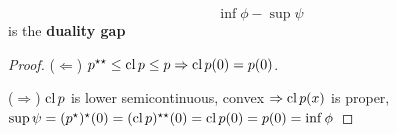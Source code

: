 \begin{defn}
  \label{defn:conjugate_functions:12}
  \begin{equation}
    \label{eq:61}
    \inf \phi - \sup \psi
  \end{equation} is the \textbf{duality gap}
\end{defn}

\begin{proof}
  ($\Leftarrow$) $p^{\star \star} \leq \operatorname*{cl} p \leq p \Rightarrow \operatorname*{cl}
  p(0) = p(0)$.
  
  ($\Rightarrow$) $\operatorname*{cl} p$ is lower semicontinuous, convex $\Rightarrow
  \operatorname*{cl} p(x)$  is proper, $\sup \psi = (p^{\star})^{\star}(0) = (\operatorname*{cl} p)^{\star
    \star}(0) = \operatorname*{cl} p(0) = p(0) = \inf \phi$
\end{proof}

\begin{proposition}
\end{proposition}


